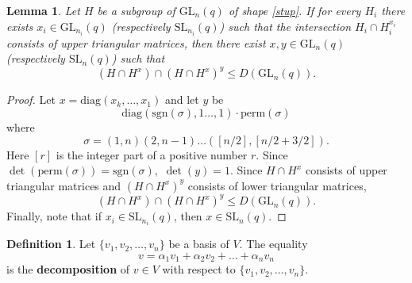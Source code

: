 \documentclass[a4paper,reqno,11pt]{amsart}
\newtheorem{Lem}[Th]{Lemma}
\theoremstyle{definition}
\newtheorem{Def}[Th]{Definition}
\theoremstyle{remark}
\numberwithin{equation}{section}
\newcommand{\diag}{\mathrm{diag}}
\newcommand{\sgn}{\mathrm{sgn}}
\newcommand{\per}{\mathrm{perm}}
\newcommand{\SL}{{\mathrm{SL}}}
\newcommand{\GL}{{\mathrm{GL}}}
\begin{document}
\begin{Lem}\label{irrtog}
Let $H$ be a subgroup of $\GL_n(q)$ of shape \eqref{stup}. If for every $H_i$ there exists $x_i \in \GL_{n_i}(q)$ (respectively $\SL_{n_i}(q)$) such that the intersection $H_i \cap H_i^{x_i}$ consists of upper triangular matrices, then there exist $x,y \in \GL_n(q)$ (respectively $\SL_n(q)$) such that 
$$(H\cap H^x) \cap (H\cap H^x)^y \le D(\GL_n(q)).$$
\end{Lem}
\begin{proof}
Let $x=\diag(x_k, \ldots, x_1)$ and let $y$ be $$\diag(\sgn(\sigma),1 \ldots,1) \cdot \per(\sigma)$$ where  $$\sigma =(1,n)(2, n-1) \ldots ([n/2], [n/2+3/2]).$$ Here $[r]$ is the integer part of a positive number $r$. Since $\det(\per(\sigma))=\sgn(\sigma),$ $\det(y)=1.$ Since
$H\cap H^x$ consists of upper triangular matrices and $(H\cap H^x)^y$ consists of lower triangular matrices, 
\begin{equation*}
(H\cap H^x) \cap (H\cap H^x)^y \le D(\GL_n(q)). %
\end{equation*} 
Finally, note that if $x_i \in \SL_{n_i}(q)$, then $x \in \SL_n(q).$ %
\end{proof}




\begin{Def}
Let $\{v_1, v_2, \ldots,  v_n \}$ be a basis of $V$. The equality 
$$v=\alpha_1v_1+ \alpha_2v_2+  \ldots+ \alpha_nv_n $$ 
is the {\bf decomposition}  of $v \in V$ with respect to $\{v_1, v_2, \ldots,  v_n \}$.
 \end{Def}
\end{document}
